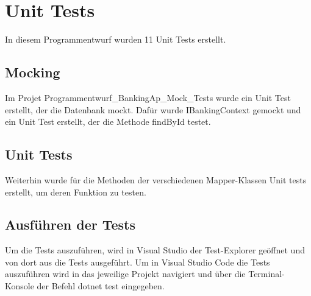 \chapter{Unit Tests}
In diesem Programmentwurf wurden 11 Unit Tests erstellt.
\section{Mocking}
Im Projet \glqq Programmentwurf\_BankingAp\_Mock\_Tests \grqq wurde ein Unit Test erstellt, der die Datenbank mockt. Dafür wurde \glqq IBankingContext \grqq gemockt und ein 
Unit Test erstellt, der die Methode \glqq findById \grqq testet.
\section{Unit Tests}
Weiterhin wurde für die Methoden der verschiedenen Mapper-Klassen Unit tests erstellt, um deren Funktion zu testen.
\section{Ausführen der Tests}
Um die Tests auszuführen, wird in Visual Studio der Test-Explorer geöffnet und von dort aus die Tests ausgeführt.
\newline Um in Visual Studio Code die Tests auszuführen wird in das jeweilige Projekt navigiert und über die Terminal-Konsole der Befehl \glqq dotnet test \grqq eingegeben.